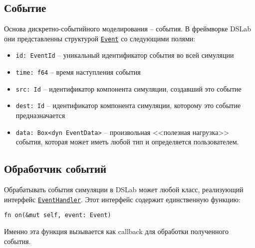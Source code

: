 \subsection{Событие} \label{Event}
Основа дискретно-событийного моделирования -- события. В фреймворке DSLab они представленны структурой \underline{\texttt{Event}} со следующими полями: 
\begin{itemize}
    \item \texttt{id: EventId} -- уникальный идентификатор события во всей симуляции
    \item \texttt{time: f64} -- время наступления события 
    \item \texttt{src: Id} -- идентификатор компонента симуляции, создавший это событие 
    \item \texttt{dest: Id} -- идентификатор компонента симуляции, которому это событие предназначается
    \item \label{Event:payload} \texttt{data: Box<dyn EventData>} -- произвольная <<полезная нагрузка>> события, которая может иметь любой тип и определяется пользователем. 
\end{itemize}

\subsection{Обработчик событий} \label{EventHandler}

Обрабатывать события симуляции в DSLab может любой класс, реализующий интерфейс \underline{\texttt{EventHandler}}. Этот интерфейс содержит единственную функцию: 
\begin{center}
\texttt{fn on(\&mut self, event: Event)}
\label{fnon}
\end{center}

Именно эта функция вызывается как callback для обработки полученного события.

